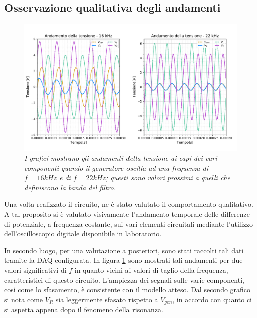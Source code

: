 \subsection{Osservazione qualitativa degli andamenti}

\begin{figure}[h!]
    \centering
    \includegraphics[width=.9\textwidth]{../figs/tensione-tempo.pdf}
    \caption{\emph{I grafici mostrano gli andamenti della tensione ai capi dei vari componenti quando il generatore
    oscilla ad una frequenza di $f=16kHz$ e di $f=22kHz$; questi sono valori prossimi a quelli che definiscono la banda del filtro.}}
    \label{fig:tensione-tempo}
\end{figure}


Una volta realizzato il circuito, ne è stato valutato il comportamento qualitativo. A tal proposito si è valutato visivamente
l'andamento temporale delle differenze di potenziale, a frequenza costante, sui vari elementi circuitali mediante
l'utilizzo dell'oscilloscopio digitale disponibile in laboratorio.

In secondo luogo, per una valutazione a posteriori, sono stati raccolti tali dati tramite la DAQ configurata.
In figura \ref{fig:tensione-tempo} sono mostrati tali andamenti per due valori significativi di $f$ in quanto vicini ai
valori di taglio della frequenza, caratteristici di questo circuito.
L'ampiezza dei segnali sulle varie componenti, così come lo sfasamento, è consistente con il modello atteso. Dal secondo
grafico si nota come $V_R$ sia leggermente sfasato rispetto a $V_{gen}$, in accordo con quanto ci si aspetta appena
dopo il fenomeno della risonanza.


